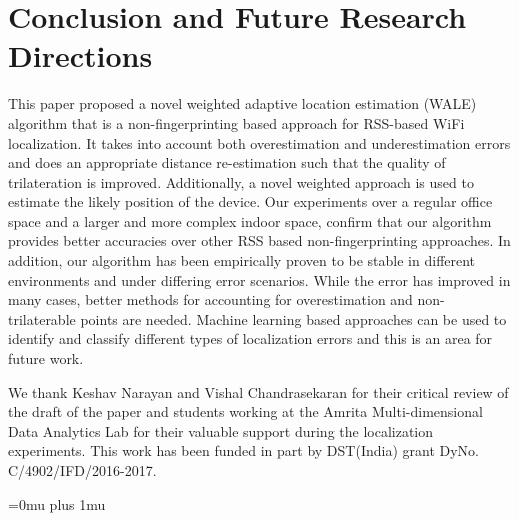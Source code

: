 \documentclass[twocolumn]{svjour3}
\begin{document}
\section{\textbf{Conclusion and Future Research Directions}}
    This paper proposed a novel weighted adaptive location estimation (WALE) algorithm that is a non-fingerprinting based approach for RSS-based WiFi localization. It takes into account both overestimation and underestimation errors and does an appropriate distance re-estimation such that the quality of trilateration is improved. Additionally, a novel weighted approach is used to estimate the likely position of the device. Our experiments over a regular office space and a larger and more complex indoor space, confirm that our algorithm provides better accuracies over other RSS based non-fingerprinting approaches. In addition, our algorithm has been empirically proven to be stable in different environments and under differing error scenarios. While the error has improved in many cases, better methods for accounting for overestimation and non-trilaterable points are needed. Machine learning based approaches can be used to identify and classify different types of localization errors and this is an area for future work.   

\begin{acknowledgements}
We thank Keshav Narayan and Vishal Chandrasekaran for their critical review of the draft of the paper and  students working at the Amrita Multi-dimensional Data Analytics Lab for their valuable support during the localization experiments. This work has been funded in part by DST(India) grant DyNo. C/4902/IFD/2016-2017. \end{acknowledgements}

\Urlmuskip=0mu plus 1mu\relax

%
%

\nocite{*}
\end{document}
